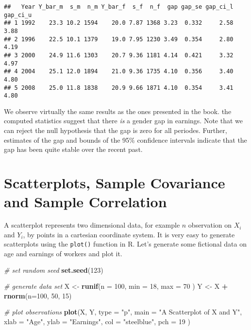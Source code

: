 \documentclass[]{book}
\newenvironment{Shaded}{\begin{snugshade}}{\end{snugshade}}
\newcommand{\KeywordTok}[1]{\textcolor[rgb]{0.13,0.29,0.53}{\textbf{#1}}}
\newcommand{\DataTypeTok}[1]{\textcolor[rgb]{0.13,0.29,0.53}{#1}}
\newcommand{\DecValTok}[1]{\textcolor[rgb]{0.00,0.00,0.81}{#1}}
\newcommand{\StringTok}[1]{\textcolor[rgb]{0.31,0.60,0.02}{#1}}
\newcommand{\CommentTok}[1]{\textcolor[rgb]{0.56,0.35,0.01}{\textit{#1}}}
\newcommand{\OperatorTok}[1]{\textcolor[rgb]{0.81,0.36,0.00}{\textbf{#1}}}
\newcommand{\NormalTok}[1]{#1}
\theoremstyle{definition}
\theoremstyle{definition}
\theoremstyle{definition}
\theoremstyle{remark}
\begin{document}
\begin{verbatim}
##   Year Y_bar_m  s_m  n_m Y_bar_f  s_f  n_f  gap gap_se gap_ci_l gap_ci_u
## 1 1992    23.3 10.2 1594    20.0 7.87 1368 3.23  0.332     2.58     3.88
## 2 1996    22.5 10.1 1379    19.0 7.95 1230 3.49  0.354     2.80     4.19
## 3 2000    24.9 11.6 1303    20.7 9.36 1181 4.14  0.421     3.32     4.97
## 4 2004    25.1 12.0 1894    21.0 9.36 1735 4.10  0.356     3.40     4.80
## 5 2008    25.0 11.8 1838    20.9 9.66 1871 4.10  0.354     3.41     4.80
\end{verbatim}

We observe virtually the same results as the ones presented in the book.
the computed statistics suggest that there \emph{is} a gender gap in
earnings. Note that we can reject the null hypothesis that the gap is
zero for all periodes. Further, estimates of the gap and bounds of the
95\% confidence intervals indicate that the gap has been quite stable
over the recent past.

\section{Scatterplots, Sample Covariance and Sample
Correlation}\label{scatterplots-sample-covariance-and-sample-correlation}

A scatterplot represents two dimensional data, for example \(n\)
observation on \(X_i\) and \(Y_i\), by points in a cartesian coordinate
system. It is very easy to generate scatterplots using the
\texttt{plot()} function in R. Let's generate some fictional data on age
and earnings of workers and plot it.

\begin{Shaded}
\begin{Highlighting}[]
\CommentTok{# set random seed}
\KeywordTok{set.seed}\NormalTok{(}\DecValTok{123}\NormalTok{)}

\CommentTok{# generate data set}
\NormalTok{X <-}\StringTok{ }\KeywordTok{runif}\NormalTok{(}\DataTypeTok{n =} \DecValTok{100}\NormalTok{, }
           \DataTypeTok{min =} \DecValTok{18}\NormalTok{, }
           \DataTypeTok{max =} \DecValTok{70}
\NormalTok{           )}
\NormalTok{Y <-}\StringTok{ }\NormalTok{X }\OperatorTok{+}\StringTok{ }\KeywordTok{rnorm}\NormalTok{(}\DataTypeTok{n=}\DecValTok{100}\NormalTok{, }\DecValTok{50}\NormalTok{, }\DecValTok{15}\NormalTok{)}

\CommentTok{# plot observations}
\KeywordTok{plot}\NormalTok{(X, }
\NormalTok{     Y, }
     \DataTypeTok{type =} \StringTok{"p"}\NormalTok{,}
     \DataTypeTok{main =} \StringTok{"A Scatterplot of X and Y"}\NormalTok{,}
     \DataTypeTok{xlab =} \StringTok{"Age"}\NormalTok{,}
     \DataTypeTok{ylab =} \StringTok{"Earnings"}\NormalTok{,}
     \DataTypeTok{col =} \StringTok{"steelblue"}\NormalTok{,}
     \DataTypeTok{pch =} \DecValTok{19}
\NormalTok{     )}
\end{Highlighting}
\end{Shaded}
\end{document}
